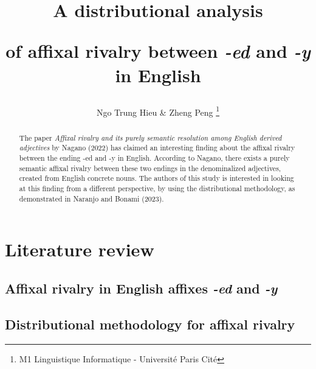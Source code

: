 \documentclass[12pt]{article}
\title{A distributional analysis 

of affixal rivalry between \emph{-ed} and \emph{-y} in English}
\author{Ngo Trung Hieu & Zheng Peng \thanks{M1 Linguistique Informatique - Université Paris Cité}}
\date{}
\begin{document}
\maketitle

\begin{abstract}
    The paper \emph{Affixal rivalry and its purely semantic resolution among English derived adjectives} by Nagano (2022) has claimed an interesting finding about the affixal rivalry between the ending -ed and -y in English. According to Nagano, there exists a purely semantic affixal rivalry between these two endings in the denominalized adjectives, created from English concrete nouns. The authors of this study is interested in looking at this finding from a different perspective, by using the distributional methodology, as demonstrated in Naranjo and Bonami (2023).
\end{abstract}

\section{Literature review}
\subsection{Affixal rivalry in English affixes \emph{-ed} and \emph{-y}}

\subsection{Distributional methodology for affixal rivalry}
\end{document}

